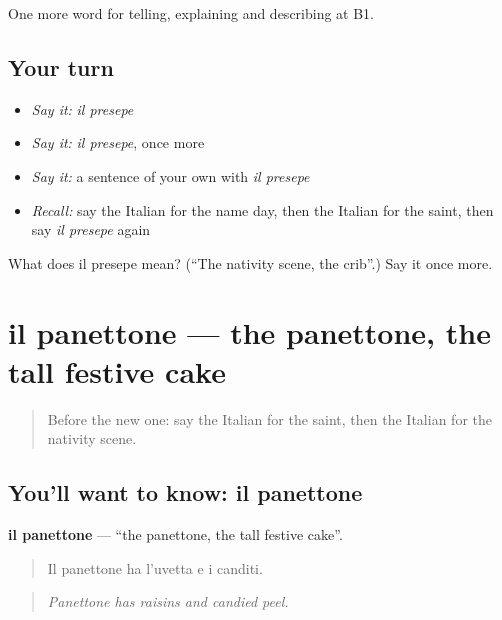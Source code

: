 \begin{grammarlens}[title={What you've built}]
One more word for telling, explaining and describing at B1.
\end{grammarlens}

\subsection*{Your turn}
\begin{itemize}
\raggedright
  \item \emph{Say it:} \emph{il presepe}
  \item \emph{Say it:} \emph{il presepe}, once more
  \item \emph{Say it:} a sentence of your own with \emph{il presepe}
  \item \emph{Recall:} say the Italian for the name day, then the Italian for the saint, then say \emph{il presepe} again
\end{itemize}

\begin{tcolorbox}[breakable,colback=teal!4,colframe=teal!35!black,title={Before you move on}]
What does il presepe mean? (\textquotedblleft{}The nativity scene, the crib\textquotedblright{}.) Say it once more.
\end{tcolorbox}
\section[il panettone]{il panettone — the panettone, the tall festive cake}

\label{lesson:IT-C321-panettone}



\begin{quote}
Before the new one: say the Italian for the saint, then the Italian for the nativity scene.
\end{quote}

\subsection*{You'll want to know: il panettone}
\textbf{il panettone} — \textquotedblleft{}the panettone, the tall festive cake\textquotedblright{}.

\begin{quote}
Il panettone ha l'uvetta e i canditi.
\end{quote}

\begin{quote}
\emph{Panettone has raisins and candied peel.}
\end{quote}

